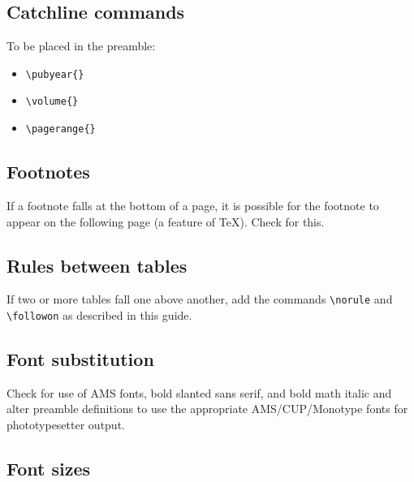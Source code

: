 \documentclass{jfm}
\begin{document}
\subsection{Catchline commands}

To be placed in the preamble:
\begin{itemize}
  \item \verb"\pubyear{}"
  \item \verb"\volume{}"
  \item \verb"\pagerange{}"
\end{itemize}

\subsection{Footnotes}

If a footnote falls at the bottom of a page, it is possible for the
footnote to appear on the following page (a feature of \TeX ). Check
for this.

\subsection{Rules between tables}

If two or more tables fall one above another, add the commands
\verb"\norule" and \verb"\followon" as described in this guide.

\subsection{Font substitution}

Check for use of AMS fonts, bold slanted sans serif, and bold math italic
and alter preamble definitions to use the appropriate AMS/CUP/Monotype
fonts for phototypesetter output.

\subsection{Font sizes}
\end{document}
